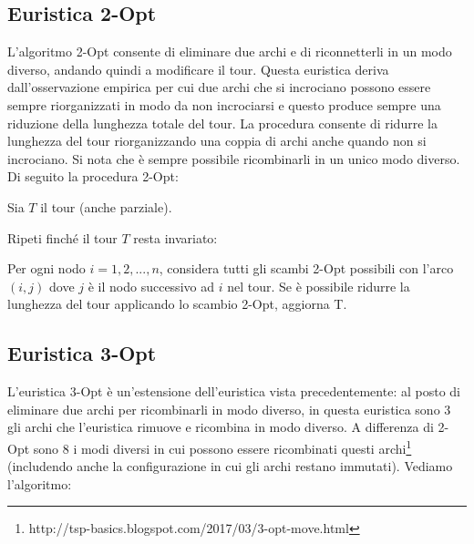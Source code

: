 \documentclass[a4paper,12pt]{report}
\begin{document}
\subsection{Euristica 2-Opt}
L'algoritmo 2-Opt\cite{2OPT} consente di eliminare due archi e di riconnetterli in un modo diverso, andando quindi a modificare il tour. Questa euristica deriva dall'osservazione empirica per cui due archi che si incrociano possono essere sempre riorganizzati in modo da non incrociarsi e questo produce sempre una riduzione della lunghezza totale del tour. La procedura consente di ridurre la lunghezza del tour riorganizzando una coppia di archi anche quando non si incrociano. Si nota che è sempre possibile ricombinarli in un unico modo diverso. Di seguito la procedura 2-Opt:

\begin{tcolorbox}[colframe=black,colback=white,boxrule=0.5pt, sharp corners]
\begin{legal}
  \item Sia $T$ il tour (anche parziale).
  \item Ripeti finché il tour $T$ resta invariato:
  \begin{legal}
    \item Per ogni nodo $i = 1, 2, ..., n$, considera tutti gli scambi 2-Opt possibili con l'arco $(i, j)$ dove $j$ è il nodo successivo ad $i$ nel tour. Se è possibile ridurre la lunghezza del tour applicando lo scambio 2-Opt, aggiorna T.
  \end{legal}
\end{legal}
\end{tcolorbox}
\hfill \break

\subsection{Euristica 3-Opt}
L'euristica 3-Opt è un'estensione dell'euristica vista precedentemente: al posto di eliminare due archi per ricombinarli in modo diverso, in questa euristica sono 3 gli archi che l'euristica rimuove e ricombina in modo diverso. A differenza di 2-Opt sono 8 i modi diversi in cui possono essere ricombinati questi archi\footnote{http://tsp-basics.blogspot.com/2017/03/3-opt-move.html} (includendo anche la configurazione in cui gli archi restano immutati). Vediamo l'algoritmo:
\end{document}

